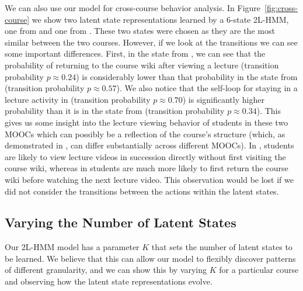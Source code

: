 We can also use our model for cross-course behavior analysis. In
Figure~\ref{fig:cross-course} we show two latent state representations
learned by a 6-state 2L-HMM, one from \textretrieval{} and one from
\sustain{}. These two states were chosen as they are the most similar
between the two courses. However, if we look at the transitions we can see
some important differences. First, in the state from \textretrieval{}, we
can see that the probability of returning to the course wiki after viewing
a lecture (transition probability $p \approx 0.24$) is considerably lower
than that probability in the state from \sustain{} (transition probability
$p \approx 0.57$). We also notice that the self-loop for staying in a
lecture activity in \textretrieval{} (transition probability $p \approx
0.70$) is significantly higher probability than it is in the state from
\sustain{} (transition probability $p \approx 0.34$).  This gives us some
insight into the lecture viewing behavior of students in these two MOOCs
which can possibly be a reflection of the course's structure (which, as
demonstrated in \citet{Davis:2016:EDM}, can differ substantially across
different MOOCs).  In \textretrieval{}, students are likely to view lecture
videos in succession directly without first visiting the course wiki,
whereas in \sustain{} students are much more likely to first return the
course wiki before watching the next lecture video. This observation would
be lost if we did not consider the transitions between the actions within
the latent states.

\subsection{Varying the Number of Latent States}
Our 2L-HMM model has a parameter $K$ that sets the number of latent states
to be learned. We believe that this can allow our model to flexibly
discover patterns of different granularity, and we can show this by varying
$K$ for a particular course and observing how the latent state
representations evolve.

